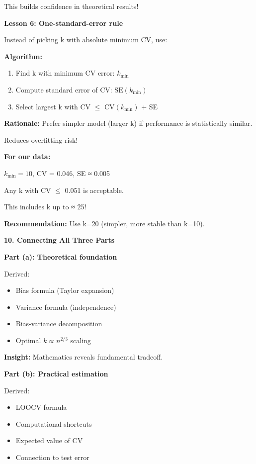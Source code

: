 \documentclass[12pt]{article}
\begin{document}
\begin{explanation}
This builds confidence in theoretical results!

\textbf{Lesson 6: One-standard-error rule}

Instead of picking k with absolute minimum CV, use:

\textbf{Algorithm:}
\begin{enumerate}
    \item Find k with minimum CV error: $k_{\min}$
    \item Compute standard error of CV: $\text{SE}(k_{\min})$
    \item Select largest k with CV $\leq$ CV$(k_{\min})$ + SE
\end{enumerate}

\textbf{Rationale:} Prefer simpler model (larger k) if performance is statistically similar.

Reduces overfitting risk!

\textbf{For our data:}

$k_{\min} = 10$, CV = 0.046, SE ≈ 0.005

Any k with CV $\leq$ 0.051 is acceptable.

This includes k up to ≈ 25!

\textbf{Recommendation:} Use k=20 (simpler, more stable than k=10).

\textbf{10. Connecting All Three Parts}

\textbf{Part (a): Theoretical foundation}

Derived:
\begin{itemize}
    \item Bias formula (Taylor expansion)
    \item Variance formula (independence)
    \item Bias-variance decomposition
    \item Optimal $k \propto n^{2/3}$ scaling
\end{itemize}

\textbf{Insight:} Mathematics reveals fundamental tradeoff.

\textbf{Part (b): Practical estimation}

Derived:
\begin{itemize}
    \item LOOCV formula
    \item Computational shortcuts
    \item Expected value of CV
    \item Connection to test error
\end{itemize}


\end{explanation}
\end{document}

